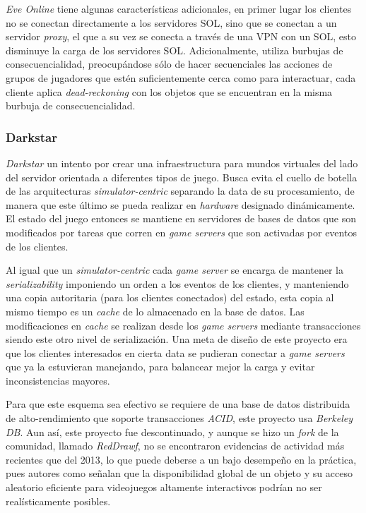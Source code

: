 \emph{Eve Online} tiene algunas características adicionales, en primer lugar los clientes no se conectan directamente a los servidores SOL, sino que se conectan a un servidor \emph{proxy}, el que a su vez se conecta a través de una VPN con un SOL, esto disminuye la carga de los servidores SOL. Adicionalmente, utiliza burbujas de consecuencialidad, preocupándose sólo de hacer secuenciales las acciones de grupos de jugadores que estén suficientemente cerca como para interactuar, cada cliente aplica \emph{dead-reckoning} con los objetos que se encuentran en la misma burbuja de consecuencialidad.

\subsubsection{Darkstar}

\emph{Darkstar} un intento por crear una infraestructura para mundos virtuales del lado del servidor orientada a diferentes tipos de juego. Busca evita el cuello de botella de las arquitecturas \emph{simulator-centric} separando la data de su procesamiento, de manera que este último se pueda realizar en \emph{hardware} designado dinámicamente. El estado del juego entonces se mantiene en servidores de bases de datos que son modificados por tareas que corren en \emph{game servers} que son activadas por eventos de los clientes.

Al igual que un \emph{simulator-centric} cada \emph{game server} se encarga de mantener la \emph{serializability} imponiendo un orden a los eventos de los clientes, y manteniendo una copia autoritaria (para los clientes conectados) del estado, esta copia al mismo tiempo es un \emph{cache} de lo almacenado en la base de datos. Las modificaciones en \emph{cache} se realizan desde los \emph{game servers} mediante transacciones siendo este otro nivel de serialización. Una meta de diseño de este proyecto era que los clientes interesados en cierta data se pudieran conectar a \emph{game servers} que ya la estuvieran manejando, para balancear mejor la carga y evitar inconsistencias mayores.

Para que este esquema sea efectivo se requiere de una base de datos distribuida de alto-rendimiento que soporte transacciones \emph{ACID}, este proyecto usa \emph{Berkeley DB}. Aun así, este proyecto fue descontinuado, y aunque se hizo un \emph{fork} de la comunidad, llamado \emph{RedDrawf}, no se encontraron evidencias de actividad más recientes que del 2013, lo que puede deberse a un bajo desempeño en la práctica, pues autores como \cite{fujita2006new} señalan que la disponibilidad global de un objeto y su acceso aleatorio eficiente para videojuegos altamente interactivos podrían no ser realísticamente posibles.

